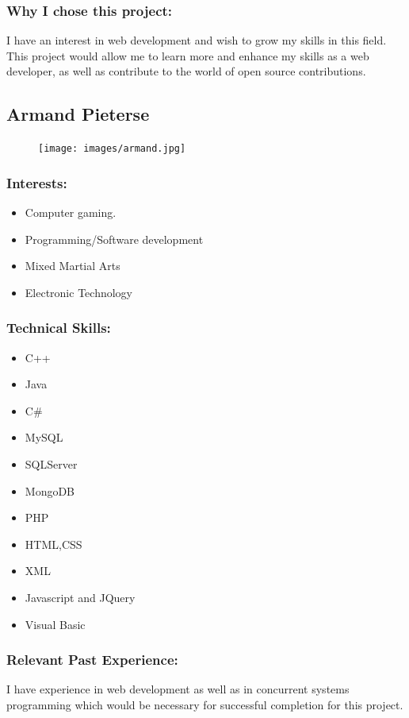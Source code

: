 \subsubsection{Why I chose this project:}
\par{I have an interest in web development and wish to grow my skills in this field. This project would allow me to learn more and enhance my skills as a web developer, as well as contribute to the world of open source contributions.}

\newpage
\subsection{Armand Pieterse}
\begin{figure}[h]
			\center
			\texttt{[image: images/armand.jpg]}
\end{figure}
\subsubsection{Interests:}
	\begin{itemize}
		\item Computer gaming.
		\item Programming/Software development
		\item Mixed Martial Arts
		\item Electronic Technology
	\end{itemize}
		
\subsubsection{Technical Skills:}
	\begin{itemize}
		\item C++
		\item Java
		\item	C\#
		\item	MySQL
		\item	SQLServer
		\item	MongoDB
		\item PHP
		\item HTML,CSS
		\item XML
		\item Javascript and JQuery
		\item Visual Basic 
	\end{itemize}

\subsubsection{Relevant Past Experience:}
	\par{I have experience in web development as well as in concurrent systems programming which would be necessary for successful completion for this project.}

